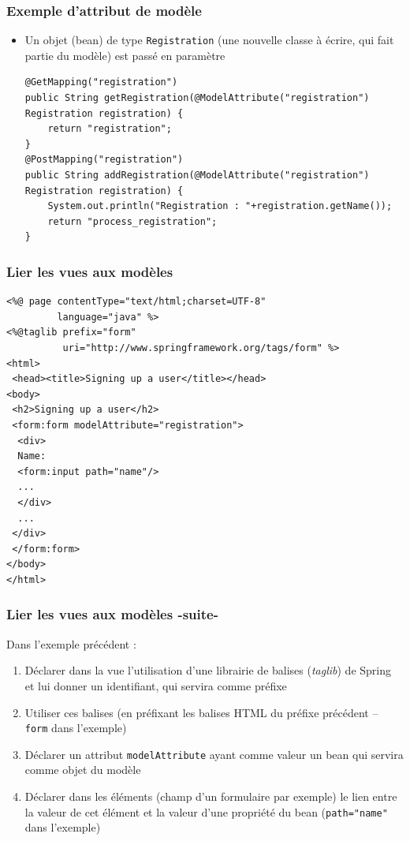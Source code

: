 \documentclass{beamer}
\begin{document}
\begin{frame}[fragile]
	\frametitle{Exemple d'attribut de modèle}
	\begin{itemize}
		\item Un objet (bean) de type \texttt{Registration} (une nouvelle classe à écrire, qui fait partie du modèle) est passé en paramètre
\begin{lstlisting}
@GetMapping("registration")
public String getRegistration(@ModelAttribute("registration") Registration registration) {
	return "registration";
}	
@PostMapping("registration")
public String addRegistration(@ModelAttribute("registration") Registration registration) {
	System.out.println("Registration : "+registration.getName());
	return "process_registration";
}
\end{lstlisting}
	\end{itemize}
\end{frame}

\begin{frame}[fragile]
	\frametitle{Lier les vues aux modèles}
\begin{lstlisting}
<%@ page contentType="text/html;charset=UTF-8" 
         language="java" %>
<%@taglib prefix="form" 
          uri="http://www.springframework.org/tags/form" %>
<html>
 <head><title>Signing up a user</title></head>
<body>
 <h2>Signing up a user</h2>
 <form:form modelAttribute="registration">
  <div>
  Name:
  <form:input path="name"/>
  ...
  </div>
  ...
 </div>
 </form:form>
</body>
</html>
\end{lstlisting}
\end{frame}

\begin{frame}
	\frametitle{Lier les vues aux modèles -suite-}
	Dans l'exemple précédent :
	\begin{enumerate}
		\item Déclarer dans la vue l'utilisation d'une librairie de balises (\textit{taglib}) de Spring et lui donner un identifiant, qui servira comme préfixe
		\item Utiliser ces balises (en préfixant les balises HTML du préfixe précédent -- \texttt{form} dans l'exemple)
		\item Déclarer un attribut \texttt{modelAttribute} ayant comme valeur un bean qui servira comme objet du modèle
		\item Déclarer dans les éléments (champ d'un formulaire par exemple) le lien entre la valeur de cet élément et la valeur d'une propriété du bean (\texttt{path="name"} dans l'exemple)
	\end{enumerate}
\end{frame}
\end{document}

